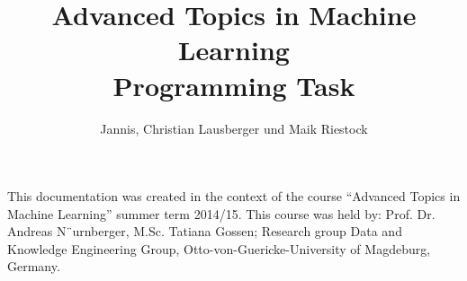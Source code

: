 \documentclass{acmtog}
\begin{document}
\title{Advanced Topics in Machine Learning\\Programming Task} 

\author{Jannis, Christian Lausberger {\upshape und} Maik Riestock
}


\keywords{}


\maketitle

\begin{bottomstuff}
This documentation was created in the context of the course “Advanced Topics in Machine Learning” summer term 2014/15.
This course was held by: Prof. Dr. Andreas N¨urnberger, M.Sc. Tatiana Gossen; Research group Data and Knowledge Engineering Group, Otto-von-Guericke-University of Magdeburg, Germany.
\end{bottomstuff}



		
			
	
	
	
	
	

\newpage

\listoftables
\appendix


\end{document}

